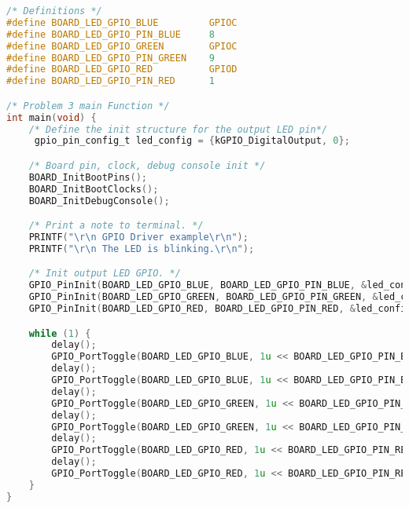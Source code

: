 \begin{lstlisting}[language=c,caption=Problem 3, label=list:p3]
/* Definitions */
#define BOARD_LED_GPIO_BLUE    	 	GPIOC
#define BOARD_LED_GPIO_PIN_BLUE	 	8
#define BOARD_LED_GPIO_GREEN     	GPIOC
#define BOARD_LED_GPIO_PIN_GREEN 	9
#define BOARD_LED_GPIO_RED     		GPIOD
#define BOARD_LED_GPIO_PIN_RED		1

/* Problem 3 main Function */
int main(void) {
    /* Define the init structure for the output LED pin*/
     gpio_pin_config_t led_config = {kGPIO_DigitalOutput, 0};

    /* Board pin, clock, debug console init */
    BOARD_InitBootPins();
    BOARD_InitBootClocks();
    BOARD_InitDebugConsole();

    /* Print a note to terminal. */
    PRINTF("\r\n GPIO Driver example\r\n");
    PRINTF("\r\n The LED is blinking.\r\n");

    /* Init output LED GPIO. */
    GPIO_PinInit(BOARD_LED_GPIO_BLUE, BOARD_LED_GPIO_PIN_BLUE, &led_config);
    GPIO_PinInit(BOARD_LED_GPIO_GREEN, BOARD_LED_GPIO_PIN_GREEN, &led_config);
    GPIO_PinInit(BOARD_LED_GPIO_RED, BOARD_LED_GPIO_PIN_RED, &led_config);

    while (1) {
        delay();
        GPIO_PortToggle(BOARD_LED_GPIO_BLUE, 1u << BOARD_LED_GPIO_PIN_BLUE);
        delay();
        GPIO_PortToggle(BOARD_LED_GPIO_BLUE, 1u << BOARD_LED_GPIO_PIN_BLUE);
        delay();
        GPIO_PortToggle(BOARD_LED_GPIO_GREEN, 1u << BOARD_LED_GPIO_PIN_GREEN);
        delay();
        GPIO_PortToggle(BOARD_LED_GPIO_GREEN, 1u << BOARD_LED_GPIO_PIN_GREEN);
        delay();
        GPIO_PortToggle(BOARD_LED_GPIO_RED, 1u << BOARD_LED_GPIO_PIN_RED);
        delay();
        GPIO_PortToggle(BOARD_LED_GPIO_RED, 1u << BOARD_LED_GPIO_PIN_RED);
    }
}
\end{lstlisting}